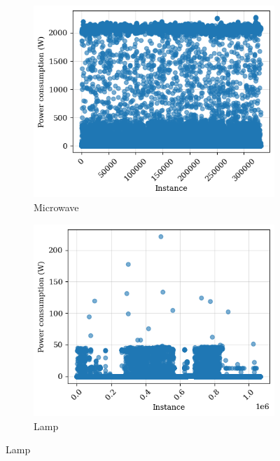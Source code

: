 \begin{figure}
\begin{subfigure}{.5\textwidth}
      \includegraphics[width=.9\linewidth]{images/raw_consumptions/microwave.png}
      \caption{Microwave}
      \label{fig:microwave}
    \end{subfigure}%
    \begin{subfigure}{.5\textwidth}
      \centering
      \includegraphics[width=.9\linewidth]{images/raw_consumptions/lamp.png}
      \caption{Lamp}
      \label{fig:lamp}
    \end{subfigure}
\end{figure}%
